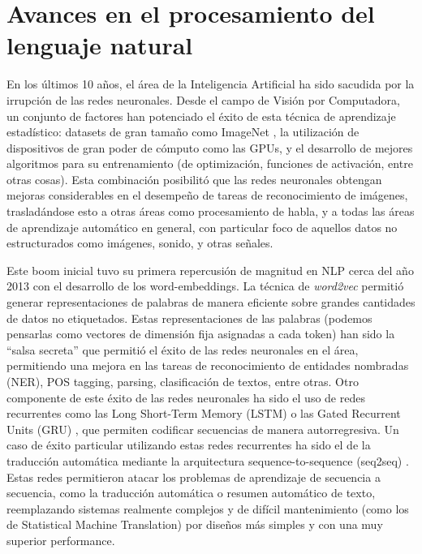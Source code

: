 \section{Avances en el procesamiento del lenguaje natural}

En los últimos 10 años, el área de la Inteligencia Artificial ha sido sacudida por la irrupción de las redes neuronales. Desde el campo de Visión por Computadora, un conjunto de factores han potenciado el éxito de esta técnica de aprendizaje estadístico: datasets de gran tamaño como ImageNet \cite{imagenet2009deng}, la utilización de dispositivos de gran poder de cómputo como las GPUs, y el desarrollo de mejores algoritmos para su entrenamiento (de optimización, funciones de activación, entre otras cosas). Esta combinación posibilitó que las redes neuronales obtengan mejoras considerables en el desempeño de tareas de reconocimiento de imágenes, trasladándose esto a otras áreas como procesamiento de habla, y a todas las áreas de aprendizaje automático en general, con particular foco de aquellos datos no estructurados como imágenes, sonido, y otras señales.

Este boom inicial tuvo su primera repercusión de magnitud en NLP cerca del año 2013 con el desarrollo de los word-embeddings. La técnica de \emph{word2vec} \cite{mikolov2013distributed} permitió generar representaciones de palabras de manera eficiente sobre grandes cantidades de datos no etiquetados. Estas representaciones de las palabras (podemos pensarlas como vectores de dimensión fija asignadas a cada token) han sido la ``salsa secreta'' que permitió el éxito de las redes neuronales en el área, permitiendo una mejora en las tareas de reconocimiento de entidades nombradas (NER), POS tagging, parsing, clasificación de textos, entre otras. Otro componente de este éxito de las redes neuronales ha sido el uso de redes recurrentes como las Long Short-Term Memory (LSTM) \cite{hochreiter1997long} o las Gated Recurrent Units (GRU) \cite{cho-etal-2014-learning}, que permiten codificar secuencias de manera autorregresiva. Un caso de éxito particular utilizando estas redes recurrentes ha sido el de la traducción automática mediante la arquitectura sequence-to-sequence (seq2seq) \cite{sutskever2014sequence}. Estas redes permitieron atacar los problemas de aprendizaje de secuencia a secuencia, como la traducción automática o resumen automático de texto, reemplazando sistemas realmente complejos y de difícil mantenimiento (como los de Statistical Machine Translation) por diseños más simples y con una muy superior performance.

